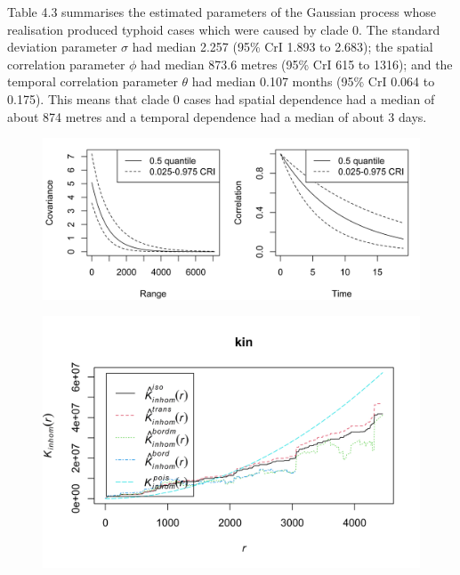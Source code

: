 \documentclass[12pt,a4paper]{report}
\begin{document}
Table 4.3 summarises the estimated parameters of the Gaussian process whose realisation produced  typhoid cases which were caused by clade 0. The standard deviation parameter $\sigma$ had median 2.257 (95\% CrI 1.893 to 2.683); the spatial correlation parameter $\phi$ had median 873.6 metres (95\% CrI 615 to 1316); and the temporal correlation parameter $\theta$ had median 0.107 months (95\% CrI 0.064 to 0.175). This means that clade 0 cases had spatial dependence had a median of about 874 metres and a temporal dependence had a median of about 3 days.\\

\begin{figure}[H]
	\begin{center}
		\includegraphics[width=\linewidth]{Posterior Covariance Function - Major 0.png}
	\end{center}
\end{figure}

\begin{figure}[H]
	\begin{center}
		\includegraphics[width=\linewidth]{Inhomogeneous K Function - Major 0.png}
	\end{center}
\end{figure}
\end{document}
